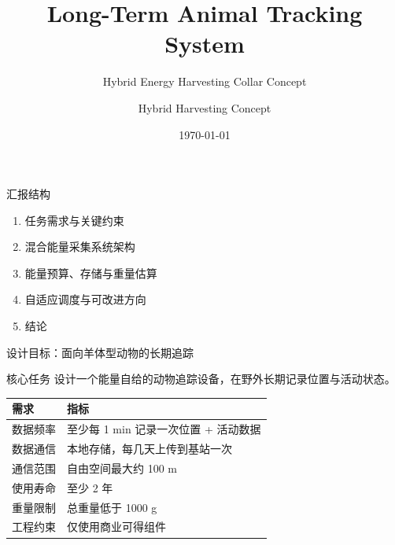 \documentclass[aspectratio=169,11pt]{ctexbeamer}
\title[Hybrid Harvesting Animal Tracker]{Long-Term Animal Tracking System}
\subtitle{Hybrid Energy Harvesting Collar Concept}
\author[Hybrid]{Hybrid Harvesting Concept}
\institute{Micro Energy Harvesting / Uni Freiburg}
\date{\today}
\begin{document}
\begin{frame}
  \titlepage
\end{frame}

\begin{frame}{汇报结构}
  \begin{enumerate}
    \item 任务需求与关键约束
    \item 混合能量采集系统架构
    \item 能量预算、存储与重量估算
    \item 自适应调度与可改进方向
    \item 结论
  \end{enumerate}
\end{frame}

\begin{frame}{设计目标：面向羊体型动物的长期追踪}
  \begin{block}{核心任务}
    设计一个能量自给的动物追踪设备，在野外长期记录位置与活动状态。
  \end{block}

  \vspace{0.4em}
  \begin{tabularx}{\textwidth}{@{}lY@{}}
    \toprule
    需求 & 指标 \\
    \midrule
    数据频率 & 至少每 1 min 记录一次位置 + 活动数据 \\
    数据通信 & 本地存储，每几天上传到基站一次 \\
    通信范围 & 自由空间最大约 100 m \\
    使用寿命 & 至少 2 年 \\
    重量限制 & 总重量低于 1000 g \\
    工程约束 & 仅使用商业可得组件 \\
    \bottomrule
  \end{tabularx}
\end{frame}
\end{document}
